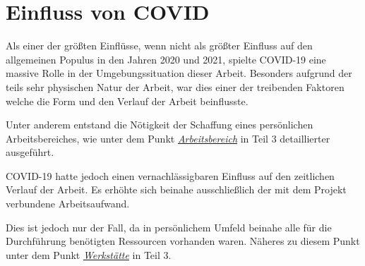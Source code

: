 \section{Einfluss von COVID}

\label{covid}

Als einer der größten Einflüsse, wenn nicht als größter Einfluss auf den allgemeinen Populus in den Jahren 2020 und 2021, spielte COVID-19 eine massive Rolle in der Umgebungssituation dieser Arbeit.
Besonders aufgrund der teils sehr physischen Natur der Arbeit, war dies einer der treibenden Faktoren welche die Form und den Verlauf der Arbeit beinflusste.

Unter anderem entstand die Nötigkeit der Schaffung eines persönlichen Arbeitsbereiches, wie unter dem Punkt \hyperref[arbeitsbereich]{\textit{Arbeitsbereich}} in Teil 3 detaillierter ausgeführt.

COVID-19 hatte jedoch einen vernachlässigbaren Einfluss auf den zeitlichen Verlauf der Arbeit. 
Es erhöhte sich beinahe ausschließlich der mit dem Projekt verbundene Arbeitsaufwand.

Dies ist jedoch nur der Fall, da in persönlichem Umfeld beinahe alle für die Durchführung benötigten Ressourcen vorhanden waren. 
Näheres zu diesem Punkt unter dem Punkt \hyperref[werkstaette]{\textit{Werkstätte}} in Teil 3.